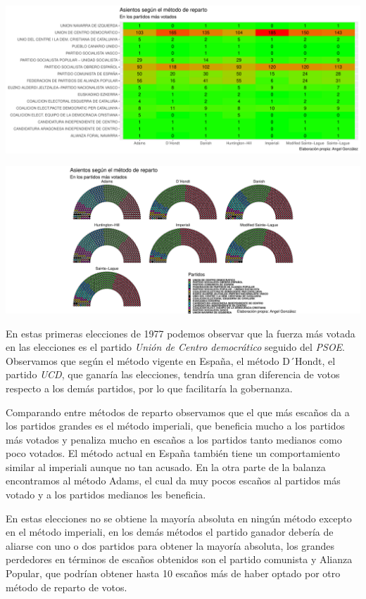 \documentclass[12pt,a4paper,]{book}
\numberwithin{dummy}{section}
\theoremstyle{ocrenumbox}
\theoremstyle{blacknumex}
\theoremstyle{blacknumbox}
\theoremstyle{ocrenum}
\theoremstyle{ocrenum}
\begin{document}
\begin{center}\includegraphics[width=0.95\linewidth]{figurasR/unnamed-chunk-59-2} \end{center}

\begin{center}\includegraphics[width=0.95\linewidth]{figurasR/unnamed-chunk-59-3} \end{center}

En estas primeras elecciones de 1977 podemos observar que la fuerza más
votada en las elecciones es el partido \emph{Unión de Centro
democrático} seguido del \emph{PSOE}. Observamos que según el método
vigente en España, el método D´Hondt, el partido \emph{UCD}, que ganaría
las elecciones, tendría una gran diferencia de votos respecto a los
demás partidos, por lo que facilitaría la gobernanza.

Comparando entre métodos de reparto observamos que el que más escaños da
a los partidos grandes es el método imperiali, que beneficia mucho a los
partidos más votados y penaliza mucho en escaños a los partidos tanto
medianos como poco votados. El método actual en España también tiene un
comportamiento similar al imperiali aunque no tan acusado. En la otra
parte de la balanza encontramos al método Adams, el cual da muy pocos
escaños al partidos más votado y a los partidos medianos les beneficia.

En estas elecciones no se obtiene la mayoría absoluta en ningún método
excepto en el método imperiali, en los demás métodos el partido ganador
debería de aliarse con uno o dos partidos para obtener la mayoría
absoluta, los grandes perdedores en términos de escaños obtenidos son el
partido comunista y Alianza Popular, que podrían obtener hasta 10
escaños más de haber optado por otro método de reparto de votos.
\end{document}

